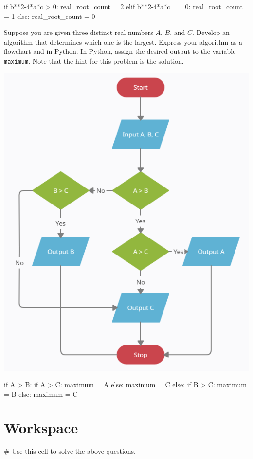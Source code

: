 \documentclass{ximera}
\begin{document}
\begin{question}
\begin{hint}
\begin{center}
		\end{center}
\begin{sageCell}
if b**2-4*a*c > 0:
	real_root_count = 2
elif b**2-4*a*c == 0:
	real_root_count = 1
else:
	real_root_count = 0
\end{sageCell}
	\end{hint}
\end{question}

\begin{question}
	Suppose you are given three distinct real numbers $A$, $B$, and $C$. Develop an algorithm that determines which one is the largest. Express your algorithm as a flowchart and in Python. In Python, assign the desired output to the variable \verb|maximum|. Note that the hint for this problem is the solution.
	\begin{hint}
		\begin{center}
			\includegraphics{maxof3.png}
		\end{center}
\begin{sageCell}
if A > B:
        if A > C:
                maximum = A
        else:
                maximum = C
else:
        if B > C:
                maximum = B
        else:
                maximum = C
\end{sageCell}
	\end{hint}
\end{question}

\section{Workspace}

\begin{sageCell}
# Use this cell to solve the above questions.
\end{sageCell}
\end{document}
